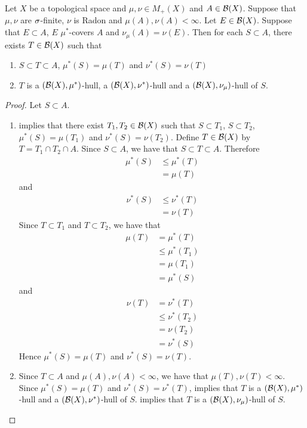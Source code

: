 \documentclass{book}
\begin{document}
	\begin{ex} 
		Let $X$ be a topological space and $\mu, \nu \in M_+(X)$ and $A \in \mathcal{B}(X)$. Suppose that $\mu,\nu$ are $\sigma$-finite, $\nu$ is Radon and $\mu(A), \nu(A) < \infty$. Let $E \in \mathcal{B}(X)$. Suppose that $E \subset A$, $E$ $\mu^*$-covers $A$ and $\nu_{\mu}(A) = \nu(E)$. Then for each $S \subset A$, there exists $T \in \mathcal{B}(X)$ such that
		\begin{enumerate}
			\item $S \subset T \subset A$, $\mu^*(S) = \mu(T)$ and $\nu^*(S) = \nu(T)$
			\item $T$ is a $(\mathcal{B}(X), \mu^*)$-hull, a $(\mathcal{B}(X), \nu^*)$-hull and a $(\mathcal{B}(X), \nu_{\mu})$-hull of $S$. 
		\end{enumerate}
	\end{ex}

	\begin{proof} Let $S \subset A$. \begin{enumerate} 
			\item {} implies that there exist $T_1, T_2 \in \mathcal{B}(X)$ such that $S \subset T_1$, $S \subset T_2$, $\mu^*(S) = \mu(T_1)$ and $\nu^*(S) = \nu(T_2)$. Define $T \in \mathcal{B}(X)$ by $T = T_1 \cap T_2 \cap A$. Since $S \subset A$, we have that $S \subset T \subset A$. Therefore 
			\begin{align*}
				\mu^*(S) 
				& \leq \mu^*(T) \\
				& = \mu(T) 
			\end{align*}
			and 
			\begin{align*}
				\nu^*(S) 
				& \leq \nu^*(T) \\
				& = \nu(T) 
			\end{align*}
			Since $T \subset T_1$ and $T \subset T_2$, we have that 
			\begin{align*}
				\mu(T) 
				& = \mu^*(T) \\
				& \leq \mu^*(T_1) \\
				& = \mu(T_1) \\
				& = \mu^*(S) 
			\end{align*}
			and 
			\begin{align*}
				\nu(T) 
				& = \nu^*(T) \\
				& \leq \nu^*(T_2) \\
				& = \nu(T_2) \\
				& = \nu^*(S) 
			\end{align*}
			Hence $\mu^*(S) = \mu(T)$ and $\nu^*(S) = \nu(T)$.
			\item Since $ T \subset A$ and $\mu(A), \nu(A) < \infty$, we have that $\mu(T), \nu(T) < \infty$. Since $\mu^*(S) = \mu(T)$ and $\nu^*(S) = \nu^*(T)$,  implies that $T$ is a $(\mathcal{B}(X), \mu^*)$-hull and a $(\mathcal{B}(X), \nu^*)$-hull of $S$.  implies that $T$ is a $(\mathcal{B}(X), \nu_{\mu})$-hull of $S$.
		\end{enumerate}
	\end{proof}
	
\end{document}
